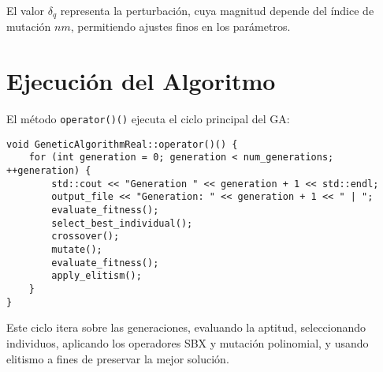 El valor \(\delta_q\) representa la perturbación, cuya magnitud depende del índice de mutación \(nm\), permitiendo ajustes finos en los parámetros.

\section{Ejecución del Algoritmo}
\label{sec:ejecucion}

El método \texttt{operator()()} ejecuta el ciclo principal del GA:

\begin{lstlisting}[style=cppstyle, caption={Ciclo principal del algoritmo}, label={lst:ga_run}]
void GeneticAlgorithmReal::operator()() {
    for (int generation = 0; generation < num_generations; ++generation) {
        std::cout << "Generation " << generation + 1 << std::endl;
        output_file << "Generation: " << generation + 1 << " | ";
        evaluate_fitness();
        select_best_individual();
        crossover();
        mutate();
        evaluate_fitness();
        apply_elitism();
    }
}
\end{lstlisting}

Este ciclo itera sobre las generaciones, evaluando la aptitud, seleccionando individuos, aplicando los operadores SBX y mutación polinomial,
y usando elitismo a fines de preservar la mejor solución.